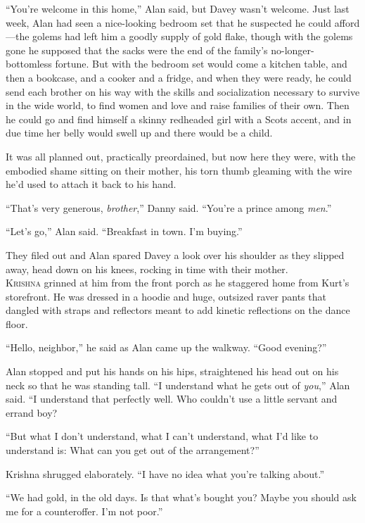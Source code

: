 ``You're welcome in this home,'' Alan said, but Davey wasn't welcome. 
Just last week, Alan had seen a nice-looking bedroom set that he
suspected he could afford---the golems had left him a goodly supply of
gold flake, though with the golems gone he supposed that the sacks
were the end of the family's no-longer-bottomless fortune.  But with
the bedroom set would come a kitchen table, and then a bookcase, and a
cooker and a fridge, and when they were ready, he could send each
brother on his way with the skills and socialization necessary to
survive in the wide world, to find women and love and raise families
of their own.  Then he could go and find himself a skinny redheaded
girl with a Scots accent, and in due time her belly would swell up and
there would be a child.

It was all planned out, practically preordained, but now here they
were, with the embodied shame sitting on their mother, his torn thumb
gleaming with the wire he'd used to attach it back to his hand.

``That's very generous, \textit{brother},'' Danny said.  ``You're a
prince among \textit{men}.''

``Let's go,'' Alan said.  ``Breakfast in town.  I'm buying.''

They filed out and Alan spared Davey a look over his shoulder as they
slipped away, head down on his knees, rocking in time with their
mother.
\\
\lettrine[lines=3, lhang=.5, nindent=0pt, findent=2pt]{K}{rishna} grinned at him from the front porch as he staggered home from
Kurt's storefront.  He was dressed in a hoodie and huge, outsized
raver pants that dangled with straps and reflectors meant to add
kinetic reflections on the dance floor.

``Hello, neighbor,'' he said as Alan came up the walkway.  ``Good
evening?''

Alan stopped and put his hands on his hips, straightened his head out
on his neck so that he was standing tall.  ``I understand what he gets
out of \textit{you},'' Alan said.  ``I understand that perfectly well. 
Who couldn't use a little servant and errand boy?

``But what I don't understand, what I can't understand, what I'd like
to understand is:  What can you get out of the arrangement?''

Krishna shrugged elaborately.  ``I have no idea what you're talking
about.''

``We had gold, in the old days.  Is that what's bought you?  Maybe you
should ask me for a counteroffer.  I'm not poor.''

